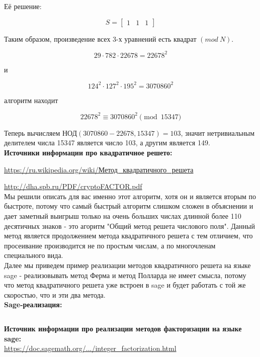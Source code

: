 \documentclass[12pt,a4paper]{scrartcl}
\begin{document}
Её решение:

$$S={\begin{bmatrix}1&1&1\end{bmatrix}}$$

Таким образом, произведение всех 3-х уравнений есть квадрат $(mod\ N)$.

$$29\cdot 782\cdot 22678=22678^{2}$$

и

$$124^{2}\cdot 127^{2}\cdot 195^{2}=3070860^{2}$$

алгоритм находит

$$22678^{2}\equiv 3070860^{2}{\pmod {15347}}$$

Теперь вычисляем НОД$(3070860 - 22678, 15347) = 103$, значит нетривиальным делителем числа 15347 является число 103, а другим является 149.\\ 

\textbf{Источники информации про квадратичное решето:}

\href{https://ru.wikipedia.org/wiki/%D0%9C%D0%B5%D1%82%D0%BE%D0%B4_%D0%BA%D0%B2%D0%B0%D0%B4%D1%80%D0%B0%D1%82%D0%B8%D1%87%D0%BD%D0%BE%D0%B3%D0%BE_%D1%80%D0%B5%D1%88%D0%B5%D1%82%D0%B0}{https://ru.wikipedia.org/wiki/Метод\_квадратичного\_решета}
	
\href{http://dha.spb.ru/PDF/cryptoFACTOR.pdf}{http://dha.spb.ru/PDF/cryptoFACTOR.pdf}\\
	
Мы решили описать для вас именно этот алгоритм, хотя он и является вторым по быстроте, потому что самый быстрый алгоритм  слишком сложен в объяснении и дает заметный выигрыш только на очень больших числах длинной более 110 десятичных знаков - это агоритм "Общий метод решета числового поля". Данный метод является продолжением метода квадратичного решета с тем отличием, что просеивание производится не по простым числам, а по многочленам специального вида.\\
	
Далее мы приведем пример реализации методов квадратичного решета на языке sage - реализовывать метод Ферма и метод Полларда не имеет смысла, потому что метод квадратичного решета уже встроен в sage и будет работать с той же скоростью, что и эти два метода.\\
	
\textbf{Sage-реализация:}
	
\inputminted[tabsize=4,obeytabs,fontsize=\footnotesize]{python3}{./RSA_scripts/recheto.sage}
	
\textbf{Источник информации про реализации методов факторизации на языке sage:}\\
	
\href{https://doc.sagemath.org/html/en/thematic_tutorials/explicit_methods_in_number_theory/integer_factorization.html}{https://doc.sagemath.org/.../integer\_factorization.html}\\
\end{document}
